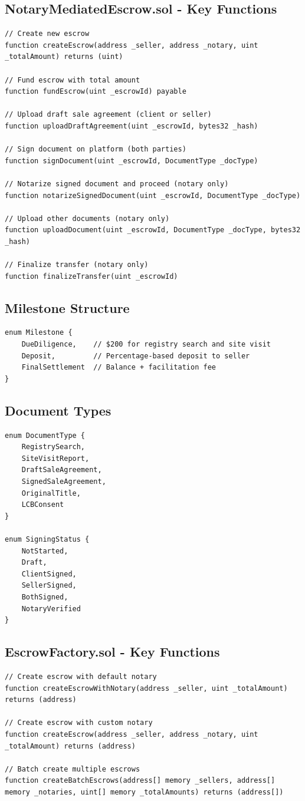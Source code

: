 \documentclass[12pt,a4paper]{article}
\begin{document}
\subsection{NotaryMediatedEscrow.sol - Key Functions}
\begin{verbatim}
// Create new escrow
function createEscrow(address _seller, address _notary, uint _totalAmount) returns (uint)

// Fund escrow with total amount
function fundEscrow(uint _escrowId) payable

// Upload draft sale agreement (client or seller)
function uploadDraftAgreement(uint _escrowId, bytes32 _hash)

// Sign document on platform (both parties)
function signDocument(uint _escrowId, DocumentType _docType)

// Notarize signed document and proceed (notary only)
function notarizeSignedDocument(uint _escrowId, DocumentType _docType)

// Upload other documents (notary only)
function uploadDocument(uint _escrowId, DocumentType _docType, bytes32 _hash)

// Finalize transfer (notary only)
function finalizeTransfer(uint _escrowId)
\end{verbatim}

\subsection{Milestone Structure}
\begin{verbatim}
enum Milestone { 
    DueDiligence,    // $200 for registry search and site visit
    Deposit,         // Percentage-based deposit to seller
    FinalSettlement  // Balance + facilitation fee
}
\end{verbatim}

\subsection{Document Types}
\begin{verbatim}
enum DocumentType { 
    RegistrySearch, 
    SiteVisitReport, 
    DraftSaleAgreement,
    SignedSaleAgreement,
    OriginalTitle, 
    LCBConsent
}

enum SigningStatus { 
    NotStarted, 
    Draft, 
    ClientSigned, 
    SellerSigned, 
    BothSigned, 
    NotaryVerified 
}
\end{verbatim}

\subsection{EscrowFactory.sol - Key Functions}
\begin{verbatim}
// Create escrow with default notary
function createEscrowWithNotary(address _seller, uint _totalAmount) returns (address)

// Create escrow with custom notary
function createEscrow(address _seller, address _notary, uint _totalAmount) returns (address)

// Batch create multiple escrows
function createBatchEscrows(address[] memory _sellers, address[] memory _notaries, uint[] memory _totalAmounts) returns (address[])
\end{verbatim}
\end{document}
